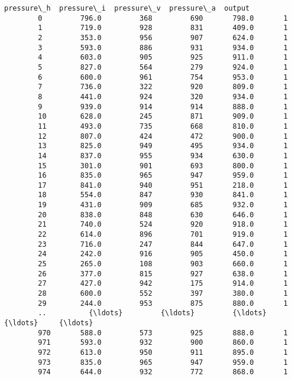 \documentclass[11pt]{article}
\begin{document}
\begin{Verbatim}[commandchars=\\\{\}]
             pressure\_h  pressure\_i  pressure\_v  pressure\_a  output  
        0         796.0         368         690       798.0       1  
        1         719.0         928         831       409.0       1  
        2         353.0         956         907       624.0       1  
        3         593.0         886         931       934.0       1  
        4         603.0         905         925       911.0       1  
        5         827.0         564         279       924.0       1  
        6         600.0         961         754       953.0       1  
        7         736.0         322         920       809.0       1  
        8         441.0         924         320       934.0       1  
        9         939.0         914         914       888.0       1  
        10        628.0         245         871       909.0       1  
        11        493.0         735         668       810.0       1  
        12        807.0         424         472       900.0       1  
        13        825.0         949         495       934.0       1  
        14        837.0         955         934       630.0       1  
        15        301.0         901         693       800.0       1  
        16        835.0         965         947       959.0       1  
        17        841.0         940         951       218.0       1  
        18        554.0         847         930       841.0       1  
        19        431.0         909         685       932.0       1  
        20        838.0         848         630       646.0       1  
        21        740.0         524         920       918.0       1  
        22        614.0         896         701       919.0       1  
        23        716.0         247         844       647.0       1  
        24        242.0         916         905       450.0       1  
        25        265.0         108         903       660.0       1  
        26        377.0         815         927       638.0       1  
        27        427.0         942         175       914.0       1  
        28        600.0         552         397       380.0       1  
        29        244.0         953         875       880.0       1  
        ..          {\ldots}         {\ldots}         {\ldots}         {\ldots}     {\ldots}  
        970       588.0         573         925       888.0       1  
        971       593.0         932         900       860.0       1  
        972       613.0         950         911       895.0       1  
        973       835.0         965         947       959.0       1  
        974       644.0         932         772       868.0       1  

\end{Verbatim}
\end{document}
